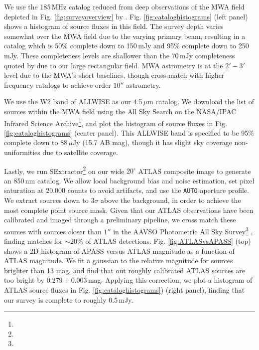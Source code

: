 \documentclass{emulateapj}
\begin{document}
We use the 185\,MHz catalog reduced from deep observations of the MWA field depicted in Fig. \ref{fig:surveyoverview} by \citet{PattiCatalog1}. Fig. \ref{fig:cataloghistograms} (left panel) shows a histogram of source fluxes in this field. The survey depth varies somewhat over the MWA field due to the varying primary beam, resulting in a catalog which is 50\% complete down to 150\,mJy and 95\% complete down to 250\,mJy. These completeness levels are shallower than the 70\,mJy completeness quoted by \citet{PattiCatalog1} due to our large rectangular field. MWA astrometry is at the $2'-3'$ level due to the MWA's short baselines, though \citep{PattiCatalog1} cross-match with higher frequency catalogs to achieve order $10''$ astrometry. 

We use the W2 band of ALLWISE \citep{Wright2010,allwise} as our 4.5\,$\mu$m catalog. We download the list of sources within the MWA field using the All Sky Search on the NASA/IPAC Infrared Science Archive\footnote{}, and plot the histogram of source fluxes in Fig. \ref{fig:cataloghistograms} (center panel). This ALLWISE band is specified to be 95\% complete down to 88\,$\mu$Jy (15.7 AB mag), though it has slight sky coverage non-uniformities due to satellite coverage.

Lastly, we run SExtractor\footnote{} \citep{sextractor} on our wide $20^\circ$ ATLAS composite image to generate an 850\,nm catalog. We allow local background bias and noise estimation, set pixel saturation at 20,000 counts to avoid artifacts, and use the {\tt AUTO} aperture profile. We extract sources down to $3\sigma$ above the background, in order to achieve the most complete point source mask. Given that our ATLAS observations have been calibrated and imaged through a preliminary pipeline, we cross match these sources with sources closer than $1''$ in the AAVSO Photometric All Sky Survey\footnote{} \citep{apass}, finding matches for $\sim20\%$ of ATLAS detections. Fig. \ref{fig:ATLASvsAPASS} (top) shows a 2D histogram of APASS versus ATLAS magnitude as a function of ATLAS magnitude. We fit a gaussian to the relative magnitude for sources brighter than 13 mag, and find that out roughly calibrated ATLAS sources are too bright by $0.279\pm0.003$\,mag. Applying this correction, we plot a histogram of ATLAS source fluxes in Fig. \ref{fig:cataloghistograms}) (right panel), finding that our survey is complete to roughly 0.5\,mJy.
\end{document}
